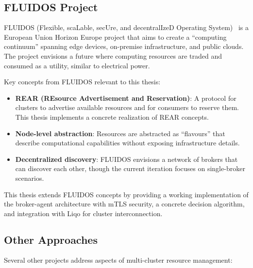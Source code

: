 \subsection{FLUIDOS Project}
\label{subsec:fluidos}

FLUIDOS (Flexible, scaLable, secUre, and decentralIzeD Operating System)~\cite{fluidos} is a European Union Horizon Europe project that aims to create a ``computing continuum'' spanning edge devices, on-premise infrastructure, and public clouds. The project envisions a future where computing resources are traded and consumed as a utility, similar to electrical power.

Key concepts from FLUIDOS relevant to this thesis:

\begin{itemize}
    \item \textbf{REAR (REsource Advertisement and Reservation)}: A protocol for clusters to advertise available resources and for consumers to reserve them. This thesis implements a concrete realization of REAR concepts.

    \item \textbf{Node-level abstraction}: Resources are abstracted as ``flavours'' that describe computational capabilities without exposing infrastructure details.

    \item \textbf{Decentralized discovery}: FLUIDOS envisions a network of brokers that can discover each other, though the current iteration focuses on single-broker scenarios.
\end{itemize}

This thesis extends FLUIDOS concepts by providing a working implementation of the broker-agent architecture with mTLS security, a concrete decision algorithm, and integration with Liqo for cluster interconnection.

\subsection{Other Approaches}
\label{subsec:other-approaches}

Several other projects address aspects of multi-cluster resource management:


